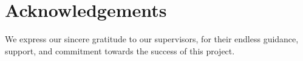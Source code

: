 \chapter*{Acknowledgements}

\vspace{10mm}
We express our sincere gratitude to our supervisors, \supervisorA \space for their endless guidance, support, and commitment towards the success of this project.
